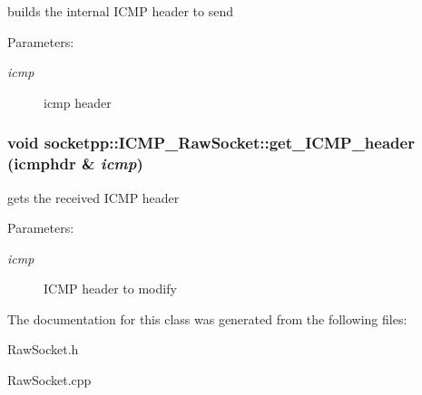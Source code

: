 builds the internal ICMP header to send 

\begin{Desc}
\item[Parameters:]
\begin{description}
\item[{\em icmp}]icmp header \end{description}
\end{Desc}
\hypertarget{classsocketpp_1_1ICMP__RawSocket_9b0ed9bb87d2895f2302db13b7ca5f06}{
\subsubsection{\setlength{\rightskip}{0pt plus 5cm}void socketpp::ICMP\_\-RawSocket::get\_\-ICMP\_\-header (icmphdr \& {\em icmp})}}
\label{classsocketpp_1_1ICMP__RawSocket_9b0ed9bb87d2895f2302db13b7ca5f06}


gets the received ICMP header 

\begin{Desc}
\item[Parameters:]
\begin{description}
\item[{\em icmp}]ICMP header to modify \end{description}
\end{Desc}


The documentation for this class was generated from the following files:\begin{CompactItemize}
\item 
RawSocket.h\item 
RawSocket.cpp\end{CompactItemize}
